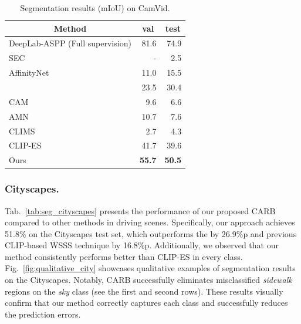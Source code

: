 \documentclass[letterpaper]{article} %
\begin{document}
\begin{table}[]
\normalsize
\centering
{\small
\begin{tabular}{@{}lrr@{}}
\toprule
\multicolumn{1}{c}{Method}          & \multicolumn{1}{c}{val}   & \multicolumn{1}{c}{test} \\ \midrule
\multicolumn{1}{l}{DeepLab-ASPP (Full supervision)}     & 81.6                      & \multicolumn{1}{r}{74.9}              \\ \midrule
\multicolumn{1}{l}{SEC} & - &  \multicolumn{1}{r}{2.5}              \\
\multicolumn{1}{l}{AffinityNet} & 11.0 & \multicolumn{1}{r}{15.5} \\
\multicolumn{1}{l}{\citeauthor{wang2020deep}} & 23.5 & \multicolumn{1}{r}{30.4} \\
\multicolumn{1}{l}{CAM} & 9.6 & \multicolumn{1}{r}{6.6} \\
\multicolumn{1}{l}{AMN} & 10.7 & \multicolumn{1}{r}{7.6} \\ 
\multicolumn{1}{l}{CLIMS} & 2.7 & \multicolumn{1}{r}{4.3} \\ 
\multicolumn{1}{l}{CLIP-ES} & 41.7 & \multicolumn{1}{r}{39.6} \\ \midrule
\multicolumn{1}{l}{Ours} & \textbf{55.7} & \multicolumn{1}{r}{\textbf{50.5}} \\ \bottomrule
\end{tabular}
}

\caption{Segmentation results (mIoU) on CamVid.}
\label{tab:seg_camvid}
\end{table}

\subsubsection{Cityscapes.} Tab.~\ref{tab:seg_cityscapes} presents the performance of our proposed CARB compared to other methods in driving scenes. Specifically, our approach achieves 51.8\% on the Cityscapes test set, which outperforms the \citeauthor{wang2020deep} by 26.9\%p and
previous CLIP-based WSSS technique by 16.8\%p. Additionally, we observed that our method consistently performs better than CLIP-ES in every class. Fig.~\ref{fig:qualitative_city} showcases qualitative examples of segmentation results on the Cityscapes. Notably, CARB successfully eliminates misclassified \textit{sidewalk} regions on the \textit{sky} class (see the first and second rows). These results visually confirm that our method correctly captures each class and successfully reduces the prediction errors. 
\end{document}
